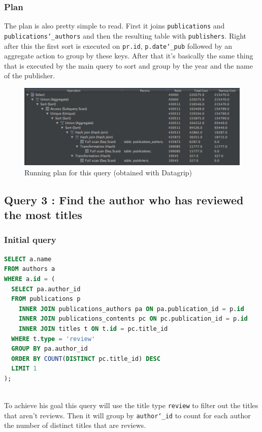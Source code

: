 \documentclass[doubleside, titlepage]{article}
\begin{document}
\subsubsection{Plan}
The plan is also pretty simple to read. First it joins \texttt{publications} and \texttt{publications\char`_authors} and then the resulting table with \texttt{publishers}. Right after this the first sort is executed on \texttt{pr.id}, \texttt{p.date\char`_pub} followed by an aggregate action to group by these keys. After that it's basically the same thing that is executed by the main query to sort and group by the year and the name of the publisher.

\begin{figure}[!htb]
	\centering
    \includegraphics[scale = 0.5]{./query_analysis/query16}
    \caption{Running plan for this query (obtained with Datagrip)}
\end{figure}


\subsection{Query 3 : Find the author who has reviewed the most titles}

\subsubsection{Initial query}
		\begin{lstlisting}[language=SQL,showspaces=false,basicstyle=\ttfamily,numberstyle=\tiny,commentstyle=\color{gray}]
SELECT a.name
FROM authors a
WHERE a.id = (
  SELECT pa.author_id
  FROM publications p
    INNER JOIN publications_authors pa ON pa.publication_id = p.id
    INNER JOIN publications_contents pc ON pc.publication_id = p.id
    INNER JOIN titles t ON t.id = pc.title_id
  WHERE t.type = 'review'
  GROUP BY pa.author_id
  ORDER BY COUNT(DISTINCT pc.title_id) DESC
  LIMIT 1
);
		\end{lstlisting}

~\\
To achieve his goal this query will use the title type \texttt{review} to filter out the titles that aren't reviews. Then it will group by \texttt{author\char`_id} to count for each author the number of distinct titles that are reviews.
~\\
		
\end{document}
